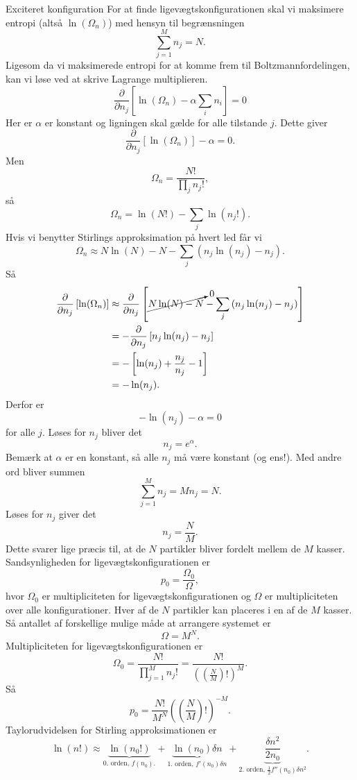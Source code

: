 \begin{opgave}{Exciteret konfiguration}
    \opg For at finde ligevægtskonfigurationen skal vi maksimere entropi (altså $\ln(\Omega_n)$) med hensyn til begrænsningen
    \[ \sum_{j=1}^Mn_j=N. \]
    Ligesom da vi maksimerede entropi for at komme frem til Boltzmannfordelingen, kan vi løse ved at skrive Lagrange multiplieren.
    \[ \frac{\partial}{\partial n_j}\left[\ln(\Omega_n)-\alpha\sum_i n_i\right]=0 \]
    Her er $\alpha$ er konstant og ligningen skal gælde for alle tilstande $j$. Dette giver
    \[ \frac{\partial}{\partial n_j}\left[\ln(\Omega_n)\right]-\alpha=0. \]
    Men
    \[ \Omega_n=\frac{N!}{\prod_j n_j!}, \]
    så
    \[ \Omega_n=\ln(N!)-\sum_j\ln(n_j!). \]
    Hvis vi benytter Stirlings approksimation på hvert led får vi
    \[ \Omega_n\approx N\ln(N)-N-\sum_j\left(n_j\ln(n_j)-n_j\right). \]
    Så
    \begin{align*}
        \frac{\partial}{\partial n_j}\left[\ln(\Omega_n)\right]&\approx\frac{\partial}{\partial n_j}\left[\cancelto{0}{N\ln(N)-N}-\sum_j\left(n_j\ln(n_j)-n_j\right)\right]\\
        &=-\frac{\partial}{\partial n_j}\left[ n_j\ln(n_j)-n_j\right]\\
        &=-\left[\ln(n_j)+\frac{n_j}{n_j}-1\right]\\
        &=-\ln(n_j).
    \end{align*}
    Derfor er
    \[ -\ln(n_j)-\alpha=0 \]
    for alle $j$. Løses for $n_j$ bliver det
    \[ n_j=e^\alpha. \]
    Bemærk at $\alpha$ er en konstant, så alle $n_j$ må være konstant (og ens!). Med andre ord bliver summen
    \[ \sum_{j=1}^M n_j=Mn_j=N. \]
    Løses for $n_j$ giver det
    \[ n_j=\frac{N}{M}. \]
    Dette svarer lige præcis til, at de $N$ partikler bliver fordelt mellem de $M$ kasser.
    \opg Sandsynligheden for ligevægtskonfigurationen er
    \[ p_0=\frac{\Omega_0}{\Omega}, \]
    hvor $\Omega_0$ er multipliciteten for ligevægtskonfigurationen og $\Omega$ er multipliciteten over alle konfigurationer. Hver af de $N$ partikler kan placeres i en af de $M$ kasser. Så antallet af forskellige mulige måde at arrangere systemet er
    \[ \Omega=M^N. \]
    Multipliciteten for ligevægtskonfigurationen er
    \[ \Omega_0=\frac{N!}{\prod_{j=1}^M n_j!}=\frac{N!}{\left(\left(\frac{N}{M}\right)!\right)^M}. \]
    Så
    \[ p_0=\frac{N!}{M^N}\left(\left(\frac{N}{M}\right)!\right)^{-M}. \]
    \opg Taylorudvidelsen for Stirling approksimationen er
    \[ \ln(n!)\approx\underbrace{\ln(n_0!)}_{\text{0. orden, $f(n_0)$.}}+\underbrace{\ln(n_0)\delta n}_{\text{1. orden, $f'(n_0)\delta n$}}+\underbrace{\frac{\delta n^2}{2n_0}}_{\text{2. orden, $\frac{1}{2}f''(n_0)\delta n^2$}}. \]

\end{opgave}
